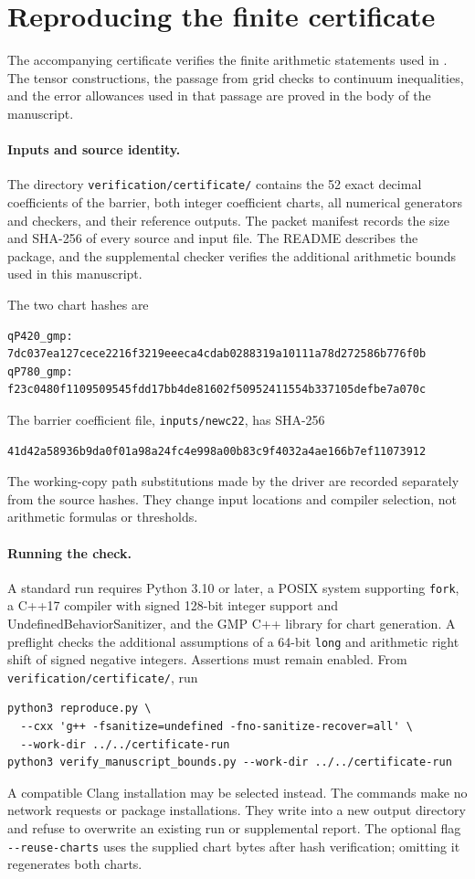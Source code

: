 \section{Reproducing the finite certificate}
\label{cert:reproducibility}

The accompanying certificate verifies the finite arithmetic statements used in
.  The tensor constructions, the passage from grid checks
to continuum inequalities, and the error allowances used in that passage are
proved in the body of the manuscript.

\paragraph{Inputs and source identity.}
The directory \texttt{verification/certificate/} contains the 52 exact decimal coefficients
of the barrier, both integer coefficient charts, all numerical generators and
checkers, and their reference outputs.  The packet manifest records the size
and SHA-256 of every source and input file.  The README describes the package,
and the supplemental checker verifies the additional arithmetic bounds used
in this manuscript.

The two chart hashes are
\begin{verbatim}
qP420_gmp:
7dc037ea127cece2216f3219eeeca4cdab0288319a10111a78d272586b776f0b
qP780_gmp:
f23c0480f1109509545fdd17bb4de81602f50952411554b337105defbe7a070c
\end{verbatim}
The barrier coefficient file, \texttt{inputs/newc22}, has SHA-256
\begin{verbatim}
41d42a58936b9da0f01a98a24fc4e998a00b83c9f4032a4ae166b7ef11073912
\end{verbatim}
The working-copy path substitutions made by the driver are recorded separately
from the source hashes.  They change input locations and compiler
selection, not arithmetic formulas or thresholds.

\paragraph{Running the check.}
A standard run requires Python 3.10 or later, a POSIX system supporting
\texttt{fork}, a C++17 compiler with signed 128-bit integer support and
UndefinedBehaviorSanitizer, and the GMP C++ library for chart generation.
A preflight checks the additional assumptions of a 64-bit \texttt{long} and
arithmetic right shift of signed negative integers.  Assertions must remain
enabled.  From \texttt{verification/certificate/}, run
\begin{verbatim}
python3 reproduce.py \
  --cxx 'g++ -fsanitize=undefined -fno-sanitize-recover=all' \
  --work-dir ../../certificate-run
python3 verify_manuscript_bounds.py --work-dir ../../certificate-run
\end{verbatim}
A compatible Clang installation may be selected instead.  The commands make no
network requests or package installations.  They write into a new output
directory and refuse to overwrite an existing run or supplemental report.
The optional flag \texttt{-{}-reuse-charts} uses the supplied chart bytes after
hash verification; omitting it regenerates both charts.

